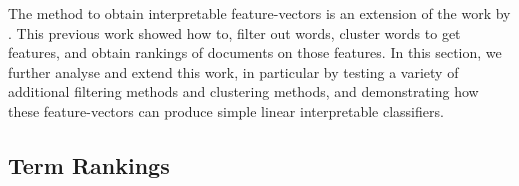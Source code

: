 The method to obtain interpretable feature-vectors is an extension of the work by \cite{derracAIJ}. This previous work showed how to, filter out words, cluster words to get features, and obtain rankings of documents on those features. In this section, we further analyse and extend this work, in particular by testing a variety of additional filtering methods and clustering methods, and demonstrating how these feature-vectors can produce simple linear interpretable classifiers. 



\subsection{Term Rankings}

